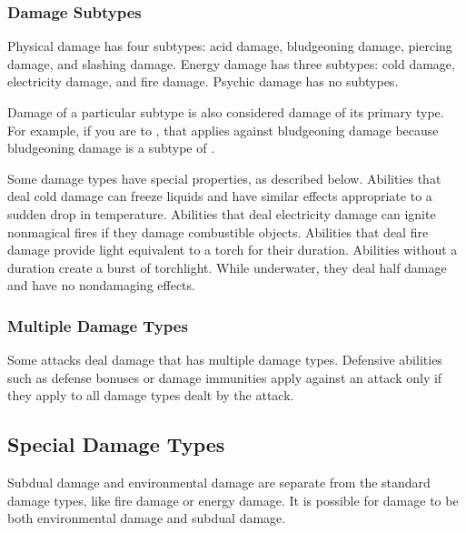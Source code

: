         \subsubsection{Damage Subtypes}\label{Damage Subtypes}
            Physical damage has four subtypes: acid damage, bludgeoning damage, piercing damage, and slashing damage.
            Energy damage has three subtypes: cold damage, electricity damage, and fire damage.
            Psychic damage has no subtypes.

            Damage of a particular subtype is also considered damage of its primary type.
            For example, if you are  to , that applies against bludgeoning damage because bludgeoning damage is a subtype of .

            Some damage types have special properties, as described below.
             Abilities that deal cold damage can freeze liquids and have similar effects appropriate to a sudden drop in temperature.
             Abilities that deal electricity damage can ignite nonmagical fires if they damage combustible objects.
             Abilities that deal fire damage provide light equivalent to a torch for their duration.
            Abilities without a duration create a  burst of torchlight.
            While underwater, they deal half damage and have no nondamaging effects.

        \subsubsection{Multiple Damage Types}\label{Multiple Damage Types}
            Some attacks deal damage that has multiple damage types.
            Defensive abilities such as defense bonuses or damage immunities apply against an attack only if they apply to all damage types dealt by the attack.

    \subsection{Special Damage Types}\label{Special Damage Types}

        Subdual damage and environmental damage are separate from the standard damage types, like fire damage or energy damage.
        It is possible for damage to be both environmental damage and subdual damage.

